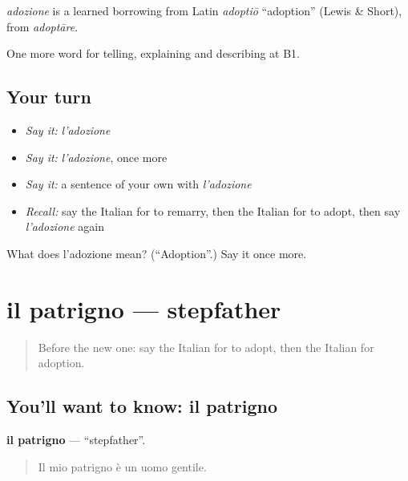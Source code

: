 \begin{cousinweb}
\emph{adozione} is a learned borrowing from Latin \emph{adoptiō} \textquotedblleft{}adoption\textquotedblright{} (Lewis \& Short), from \emph{adoptāre}.
\end{cousinweb}

\begin{grammarlens}[title={What you've built}]
One more word for telling, explaining and describing at B1.
\end{grammarlens}

\subsection*{Your turn}
\begin{itemize}
\raggedright
  \item \emph{Say it:} \emph{l'adozione}
  \item \emph{Say it:} \emph{l'adozione}, once more
  \item \emph{Say it:} a sentence of your own with \emph{l'adozione}
  \item \emph{Recall:} say the Italian for to remarry, then the Italian for to adopt, then say \emph{l'adozione} again
\end{itemize}

\begin{tcolorbox}[breakable,colback=teal!4,colframe=teal!35!black,title={Before you move on}]
What does l'adozione mean? (\textquotedblleft{}Adoption\textquotedblright{}.) Say it once more.
\end{tcolorbox}
\section[il patrigno]{il patrigno — stepfather}

\label{lesson:IT-C495-patrigno}



\begin{quote}
Before the new one: say the Italian for to adopt, then the Italian for adoption.
\end{quote}

\subsection*{You'll want to know: il patrigno}
\textbf{il patrigno} — \textquotedblleft{}stepfather\textquotedblright{}.

\begin{quote}
Il mio patrigno è un uomo gentile.
\end{quote}


